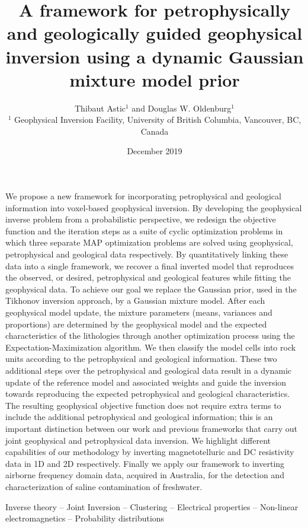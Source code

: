 \documentclass[extra]{gji} %
\title[A framework for petrophysically and geologically guided inversion]
  {A framework for petrophysically and geologically guided geophysical inversion using a dynamic Gaussian mixture model prior}
\author[Thibaut Astic and Douglas W. Oldenburg]
  {Thibaut Astic$^1$ and Douglas W. Oldenburg$^1$\\
  $^1$ Geophysical Inversion Facility, University of British Columbia, Vancouver, BC, Canada
  }
\date{December 2019}
\begin{document}
\eqsecnum

\label{firstpage}

\maketitle

\begin{summary}
We propose a new framework for incorporating petrophysical and geological information into voxel-based geophysical inversion. By developing the geophysical inverse problem from a probabilistic perspective, we redesign the objective function and the iteration steps as a suite of cyclic optimization problems in which three separate MAP optimization problems are solved using geophysical, petrophysical and geological data respectively. By quantitatively linking these data into a single framework, we recover a final inverted model that reproduces the observed, or desired, petrophysical and geological features while fitting the geophysical data. To achieve our goal we replace the Gaussian prior, used in the Tikhonov inversion approach, by a Gaussian mixture model. After each geophysical model update, the mixture parameters (means, variances and proportions) are determined by the geophysical model and the expected characteristics of the lithologies through another optimization process using the Expectation-Maximization algorithm. We then classify the model cells into rock units according to the petrophysical and geological information. These two additional steps over the petrophysical and geological data result in a dynamic update of the reference model and associated weights and guide the inversion towards reproducing the expected petrophysical and geological characteristics. The resulting geophysical objective function does not require extra terms to include the additional petrophysical and geological information; this is an important distinction between our work and previous frameworks that carry out joint geophysical and petrophysical data inversion. We highlight different capabilities of our methodology by inverting magnetotelluric and DC resistivity data in 1D and 2D respectively. Finally we apply our framework to inverting airborne frequency domain data, acquired in Australia, for the detection and characterization of saline contamination of freshwater.
\end{summary}

\begin{keywords}
Inverse theory -- Joint Inversion -- Clustering -- Electrical properties -- Non-linear electromagnetics -- Probability distributions
\end{keywords}
\end{document}
